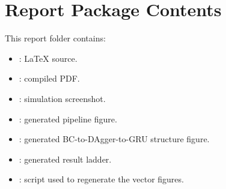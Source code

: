 \documentclass[11pt]{article}
\begin{document}
\section{Report Package Contents}

This report folder contains:

\begin{itemize}
  \item {}: LaTeX source.
  \item {}: compiled PDF.
  \item {}: simulation screenshot.
  \item {}: generated pipeline figure.
  \item {}: generated BC-to-DAgger-to-GRU structure figure.
  \item {}: generated result ladder.
  \item {}: script used to regenerate the vector figures.
\end{itemize}
\end{document}

